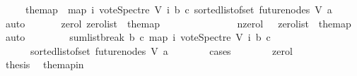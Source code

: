 \begin{isabellebody}
\ \ \ \ \ {\isachardoublequoteopen}the{\isacharunderscore}{\kern0pt}map\ {\isacharequal}{\kern0pt}\ {\isacharparenleft}{\kern0pt}map\ {\isacharparenleft}{\kern0pt}{\isasymlambda}i{\isachardot}{\kern0pt}\ vote{\isacharunderscore}{\kern0pt}Spectre\ V\ i\ b\ c{\isacharparenright}{\kern0pt}\ {\isacharparenleft}{\kern0pt}sorted{\isacharunderscore}{\kern0pt}list{\isacharunderscore}{\kern0pt}of{\isacharunderscore}{\kern0pt}set\ {\isacharparenleft}{\kern0pt}future{\isacharunderscore}{\kern0pt}nodes\ V\ a{\isacharparenright}{\kern0pt}{\isacharparenright}{\kern0pt}{\isacharparenright}{\kern0pt}{\isachardoublequoteclose}\ \isamarkupfalse%
\ auto\isanewline
\ \ \ \ \ \isamarkupfalse%
\ {\isacharparenleft}{\kern0pt}zero{\isacharunderscore}{\kern0pt}l{\isacharparenright}{\kern0pt}\ {\isachardoublequoteopen}zero{\isacharunderscore}{\kern0pt}list\ \ the{\isacharunderscore}{\kern0pt}map{\isachardoublequoteclose}\ {\isacharbar}{\kern0pt}\isanewline
\ \ \ \ \ \ \ \ \ \ \ \ \ \ {\isacharparenleft}{\kern0pt}n{\isacharunderscore}{\kern0pt}zero{\isacharunderscore}{\kern0pt}l{\isacharparenright}{\kern0pt}\ {\isachardoublequoteopen}\ {\isasymnot}\ zero{\isacharunderscore}{\kern0pt}list\ \ the{\isacharunderscore}{\kern0pt}map{\isachardoublequoteclose}\ \isamarkupfalse%
\ auto\isanewline
\ \ \ \ \ \isamarkupfalse%
\ \isamarkupfalse%
\ {\isachardoublequoteopen}sumlist{\isacharunderscore}{\kern0pt}break\ b\ c\ {\isacharparenleft}{\kern0pt}map\ {\isacharparenleft}{\kern0pt}{\isasymlambda}i{\isachardot}{\kern0pt}\ vote{\isacharunderscore}{\kern0pt}Spectre\ V\ i\ b\ c{\isacharparenright}{\kern0pt}\ \isanewline
\ \ \ \ \ \ {\isacharparenleft}{\kern0pt}sorted{\isacharunderscore}{\kern0pt}list{\isacharunderscore}{\kern0pt}of{\isacharunderscore}{\kern0pt}set\ {\isacharparenleft}{\kern0pt}future{\isacharunderscore}{\kern0pt}nodes\ V\ a{\isacharparenright}{\kern0pt}{\isacharparenright}{\kern0pt}{\isacharparenright}{\kern0pt}\ {\isasymin}\ {\isacharbraceleft}{\kern0pt}{}{\isacharcomma}{\kern0pt}{}{\isacharbraceright}{\kern0pt}{\isachardoublequoteclose}\isanewline
\ \ \ \ \ \isamarkupfalse%
{\isacharparenleft}{\kern0pt}cases{\isacharparenright}{\kern0pt}\isanewline
\ \ \ \ \ \ \isamarkupfalse%
\ zero{\isacharunderscore}{\kern0pt}l\isanewline
\ \ \ \ \ \ \isamarkupfalse%
\ \isamarkupfalse%
\ {\isacharquery}{\kern0pt}thesis\ \isamarkupfalse%
\ the{\isacharunderscore}{\kern0pt}map{\isacharunderscore}{\kern0pt}in\ \isamarkupfalse%

\end{isabellebody}
